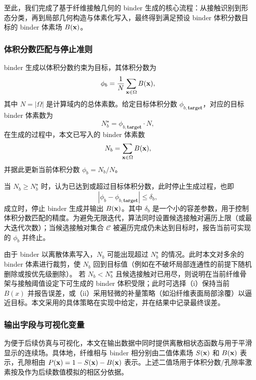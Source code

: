 至此，我们完成了基于纤维接触几何的 binder 生成的核心流程：从接触识别到形态分类，再到局部几何构造与体素化写入，最终得到满足预设 binder 体积分数目标的 binder 体素场 $B(\textbf x)$。

\subsubsection{\textbf{体积分数匹配与停止准则}}

binder 生成以体积分数约束为目标，其体积分数为
\begin{equation}
\phi_b = \frac{1}{N} \sum_{\textbf x \in \Omega} B(\textbf x),
\end{equation}
其中 $N = |\Omega|$ 是计算域内的总体素数。给定目标体积分数 $\phi_{b,\textbf{target}}$，对应的目标 binder 体素数为
\begin{equation}
N_b^{\star} = \phi_{b,\textbf{target}} \cdot N,
\end{equation}
在生成的过程中，本文已写入的 binder 体素数
\begin{equation}
N_b = \sum_{\textbf x \in \Omega} B(\textbf x),
\end{equation}
并据此更新当前体积分数 $\phi_b = N_b / N$。

当 $N_b \ge N_b^{\star}$ 时，认为已达到或超过目标体积分数，此时停止生成过程，也即
\begin{equation}
|\phi_b - \phi_{b,\textbf{target}}| \le \delta_b,
\end{equation}
成立时，停止 binder 生成并输出 $B(\textbf x)$。其中 $\delta_b$ 是一个小的容差参数，用于控制体积分数匹配的精度。为避免无限迭代，算法同时设置候选接触对遍历上限（或最大迭代次数）；当候选接触对集合 $\mathcal{C}$ 被遍历完成仍未达到目标时，报告当前可实现的 $\phi_b$ 并终止。

由于 binder 以离散体素写入，$N_b$ 可能出现超过 $N_b^{\star}$ 的情况。此时本文对多余的 binder 体素进行裁剪，使 $N_b$ 回到目标值（例如在不破坏局部连通性的前提下随机删除或按优先级删除）。
若 $N_b < N_b^{\star}$ 且候选接触对已用尽，则说明在当前纤维骨架与接触阈值设定下可生成的 binder 体积受限；此时可选择（i）保持当前 $B(x)$ 并报告误差，或（ii）采用轻微的补量策略（如沿纤维表面局部涂覆）以逼近目标。本文采用的具体策略在实现中给定，并在结果中记录最终误差。

\subsubsection{\textbf{输出字段与可视化变量}}

为便于后续仿真与可视化，本文在输出数据中同时提供离散相状态函数与用于平滑显示的连续场。具体地，纤维相与 binder 相分别由二值体素场 $S(\textbf x)$ 和 $B(\textbf x)$ 表示，孔隙相由 $P(\textbf x) = 1 - S(\textbf x) - B(\textbf x)$ 表示。上述二值场用于体积分数/孔隙率激素按及作为后续数值模拟的相区分依据。

